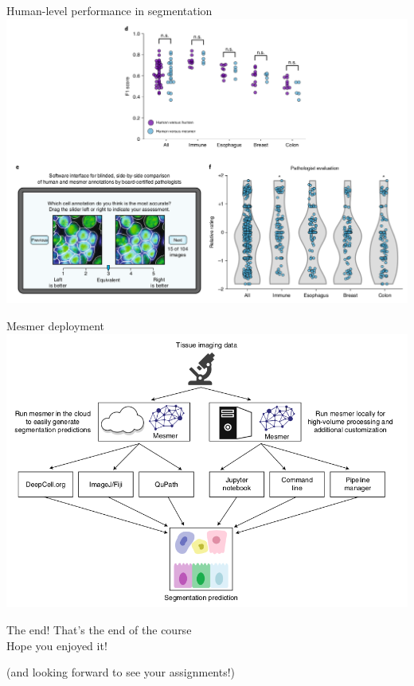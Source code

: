 \documentclass[9pt, aspectratio=169]{beamer}
\begin{document}
\begin{frame}
    {Human-level performance in segmentation}
    \centering
    \includegraphics[width=.7\textwidth]{Greenwald2021_Mesmer_vs_human.png}
\end{frame}

\begin{frame}
    {Mesmer deployment}
    \centering
    \includegraphics[width=.75\textwidth]{Greenwald2021_Mesmer_deployment.png}
\end{frame}

\begin{frame}
{The end!}
\centering
\Large
That's the end of the course\\
Hope you enjoyed it!

\footnotesize
(and looking forward to see your assignments!)
\end{frame}
\end{document}

